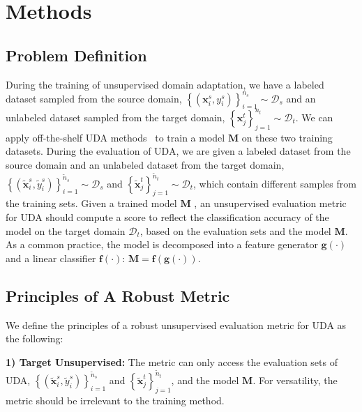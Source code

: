 \documentclass{article} %
\begin{document}
\section{Methods}
\subsection{Problem Definition}
During the training of unsupervised domain adaptation, we have a labeled dataset sampled from the source domain, $\left\{\left(\boldsymbol{x}_i^s, y_i^s\right)\right\}_{i=1}^{n_s} \sim \mathcal{D}_s$ and an unlabeled dataset sampled from the target domain, $\left\{\boldsymbol{x}_j^t\right\}_{j=1}^{n_t} \sim \mathcal{D}_t$. We can apply off-the-shelf UDA methods~\cite{DANN,CDAN,MDD,MCC} to train a model $\boldsymbol{M}$ on these two training datasets. 
During the evaluation of UDA, we are given a labeled dataset from the source domain and an unlabeled dataset from the target domain, $\left\{(\tilde{\boldsymbol{x}}_i^s, \tilde{y}_i^s)\right\}_{i=1}^{\tilde{n}_s} \sim \mathcal{D}_s$ and $\left\{\tilde{\boldsymbol{x}}_j^t\right\}_{j=1}^{\tilde{n}_t} \sim \mathcal{D}_t$, which contain different samples from the training sets. Given a trained model $\boldsymbol{M}$
, an unsupervised evaluation metric for UDA should compute a score to reflect the classification accuracy of the model on the target domain $\mathcal{D}_t$, based on the evaluation sets and the model $\boldsymbol{M}$. As a common practice, the model is decomposed into a feature generator $\textbf{g}(\cdot)$ and a linear classifier $\textbf{f}(\cdot)$: $\boldsymbol{M}=\textbf{f}(\textbf{g}(\cdot))$. 

\subsection{Principles of A Robust Metric}
\label{sec:3.2}

We define the principles of a robust unsupervised evaluation metric for UDA as the following:

\textbf{1) Target Unsupervised:} The metric can only access the evaluation sets of UDA, $\left\{(\tilde{\boldsymbol{x}}_i^s, \tilde{y}_i^s)\right\}_{i=1}^{\tilde{n}_s}$ and $\left\{\tilde{\boldsymbol{x}}_j^t\right\}_{j=1}^{\tilde{n}_t}$, and the model $\boldsymbol{M}$. For versatility, the metric should be irrelevant to the training method.
\end{document}
